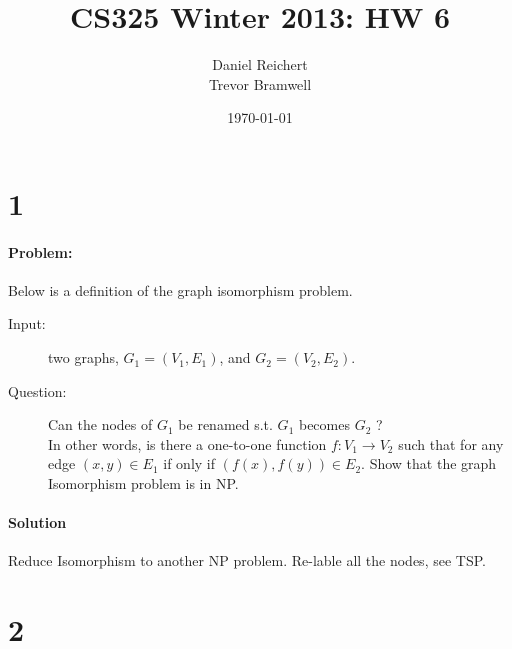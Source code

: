 \documentclass[12pt]{article}
\title{CS325 Winter 2013: HW 6}
\author{
    Daniel Reichert \\
    Trevor Bramwell \\
}
\date{\today}
\begin{document}
\maketitle
\section*{1}
\paragraph{Problem:}
Below is a definition of the graph isomorphism problem.\\
\begin{description}
\item[Input:]
        two graphs, $G_1 = (V_1 , E_1)$, and $G_2 = (V_2 , E_2)$.
\item[Question:] Can the nodes of $G_1$ be renamed s.t. $G_1$ becomes $G_2$ ?\\
        In other words, is there a one-to-one function $f : V_1 \rightarrow V_2$
        such that for any edge $(x, y) \in E_1$ if only if
        $(f (x), f (y)) \in E_2$. Show that the graph Isomorphism problem is in NP.
\end{description}

\paragraph{Solution}
    Reduce Isomorphism to another NP problem. Re-lable all the nodes,
    see TSP.


\section*{2}
\end{document}
